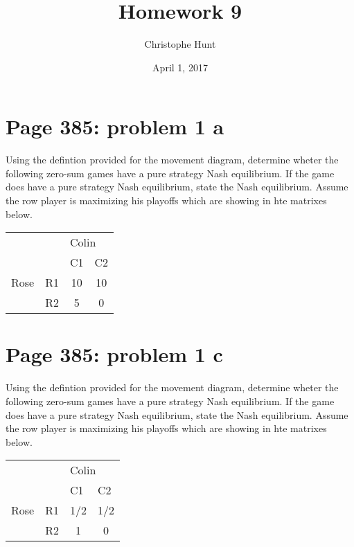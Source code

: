 \documentclass[]{article}
\title{Homework 9}
\author{Christophe Hunt}
\date{April 1, 2017}
\begin{document}
\maketitle

{
\setcounter{tocdepth}{2}
\tableofcontents
}
\newpage

\section{Page 385: problem 1 a}\label{page-385-problem-1-a}

Using the defintion provided for the movement diagram, determine wheter
the following zero-sum games have a pure strategy Nash equilibrium. If
the game does have a pure strategy Nash equilibrium, state the Nash
equilibrium. Assume the row player is maximizing his playoffs which are
showing in hte matrixes below.

\begin{table}[!h]
\centering
\begin{tabular}{lllc}
 &  & \multicolumn{2}{l}{Colin} \\ \cline{3-4}
 &  & C1 & \multicolumn{1}{l}{C2} \\ \hline
Rose & R1 & \multicolumn{1}{c}{10} & 10 \\
 & R2 & \multicolumn{1}{c}{5} & 0 \\ \hline
\end{tabular}
\end{table}

\section{Page 385: problem 1 c}\label{page-385-problem-1-c}

Using the defintion provided for the movement diagram, determine wheter
the following zero-sum games have a pure strategy Nash equilibrium. If
the game does have a pure strategy Nash equilibrium, state the Nash
equilibrium. Assume the row player is maximizing his playoffs which are
showing in hte matrixes below.

\begin{table}[!h]
\centering
\begin{tabular}{lllc}
 &  & \multicolumn{2}{l}{Colin} \\ \cline{3-4}
 &  & C1 & \multicolumn{1}{l}{C2} \\ \hline
Rose & R1 & \multicolumn{1}{c}{1/2} & 1/2 \\
 & R2 & \multicolumn{1}{c}{1} & 0 \\ \hline
\end{tabular}
\end{table}
\end{document}
